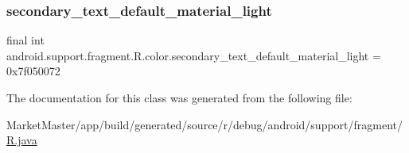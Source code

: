 \subsubsection{\texorpdfstring{secondary\+\_\+text\+\_\+default\+\_\+material\+\_\+light}{secondary\_text\_default\_material\_light}}
{\footnotesize\ttfamily final int android.\+support.\+fragment.\+R.\+color.\+secondary\+\_\+text\+\_\+default\+\_\+material\+\_\+light = 0x7f050072\hspace{0.3cm}{\ttfamily [static]}}



The documentation for this class was generated from the following file\+:\begin{DoxyCompactItemize}
\item 
Market\+Master/app/build/generated/source/r/debug/android/support/fragment/\mbox{\hyperlink{debug_2android_2support_2fragment_2R_8java}{R.\+java}}\end{DoxyCompactItemize}

